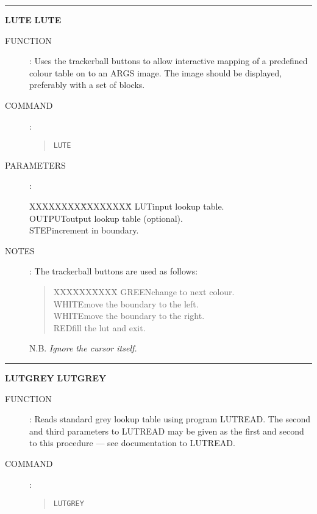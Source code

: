 \goodbreak
\rule{\textwidth}{0.3mm}
{\Large {\bf LUTE} \hfill {\bf LUTE}}
\begin{description}
\item [FUNCTION]:
Uses the trackerball buttons to allow interactive mapping of a predefined
colour table on to an ARGS image.
The image should be displayed, preferably with a set of blocks.
\item [COMMAND]:
\begin{quote}
{\tt LUTE}
\end{quote}
\item [PARAMETERS] :
\begin{tabbing}
XXXXXXXX\=XXXXXXXX\=\kill
LUT\>\>input lookup table.\\
OUTPUT\>\>output lookup table (optional).\\
STEP\>increment in boundary.
\end{tabbing}
\item [NOTES]:
The trackerball buttons are used as follows:
\begin{quote}
\begin{tabbing}
XXXXXX\=XXXX\=\kill
GREEN\>change to next colour.\\
WHITE\>move the boundary to the left.\\
WHITE\>move the boundary to the right.\\
RED\>fill the lut and exit.
\end{tabbing}
\end{quote}
N.B. {\em Ignore the cursor itself.}
\end{description}

\goodbreak
\rule{\textwidth}{0.3mm}
{\Large {\bf LUTGREY} \hfill {\bf LUTGREY}}
\begin{description}
\item [FUNCTION]:
Reads standard grey lookup table using program LUTREAD.
The second and third parameters to LUTREAD may be given as the first and
second to this procedure --- see documentation to LUTREAD.
\item [COMMAND]:
\begin{quote}
{\tt LUTGREY}
\end{quote}
\end{description}

